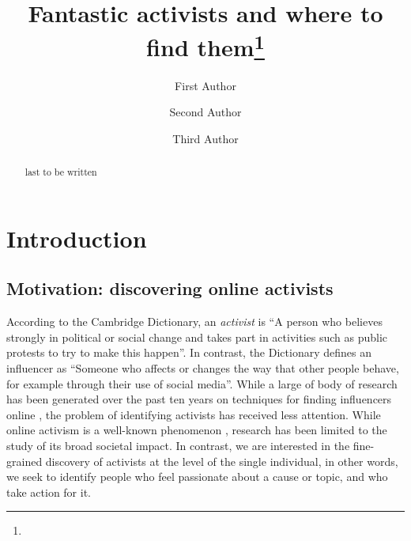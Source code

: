 \documentclass[runningheads]{llncs}
\begin{document}
%
\title{Fantastic activists and where to find them\thanks{}}
%
%
\author{First Author \and
Second Author \and
Third Author}
%
%
%
\maketitle              %
%
\begin{abstract}
last to be written
\end{abstract}
%


%
%
\section{Introduction}


\subsection{Motivation: discovering online activists}

According to the Cambridge Dictionary, an \textit{activist} is  ``A person who believes strongly in political or social change and takes part in activities such as public protests to try to make this happen''.
In contrast, the Dictionary defines an influencer as ``Someone who affects or changes the way that other people behave, for example through their use of social media''.
%
While a large of body of research has been generated over the past ten years on techniques for finding influencers online \cite{RIQUELME2016949}, the problem of identifying activists has received less attention. 
While online activism is a well-known phenomenon \cite{IJoC1246}, research has been limited to the study of its broad societal impact. 
In contrast, we are interested in the fine-grained discovery of activists at the level of the single individual, in other words, we seek to identify people who feel passionate about a cause or topic, and who take action for it.
\end{document}
